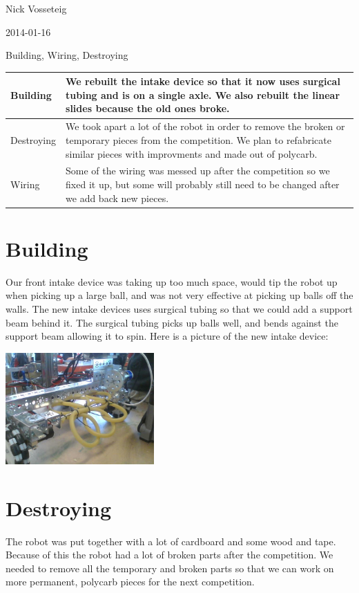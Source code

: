 Nick Vosseteig

2014-01-16

Building, Wiring, Destroying

\begin{tabular}{|p{5cm}|p{5cm}|}
 \hline
 Building&
We rebuilt the intake device so that it now uses surgical tubing and is on a single axle. We also rebuilt the linear slides because the old ones broke.
 \\
 \hline
Destroying&
We took apart a lot of the robot in order to remove the broken or temporary pieces from the competition. We plan to refabricate similar pieces with improvments and made out of polycarb.
 \\
 \hline
Wiring&
Some of the wiring was messed up after the competition so we fixed it up, but some will probably still need to be changed after we add back new pieces.
 \\
 \hline
\end{tabular}

\section*{Building}
Our front intake device was taking up too much space, would tip the robot up when picking up a large ball, and was not very effective at picking up balls off the walls. The new intake devices uses surgical tubing so that we could add a support beam behind it. The surgical tubing picks up balls well, and bends against the support beam allowing it to spin. Here is a picture of the new intake device:

\begin{center}
 \includegraphics[width=215px]{./Entries/Images/new_intake.jpg}
\end{center}

\section*{Destroying}
The robot was put together with a lot of cardboard and some wood and tape. Because of this the robot had a lot of broken parts after the competition. We needed to remove all the temporary and broken parts so that we can work on more permanent, polycarb pieces for the next competition.
